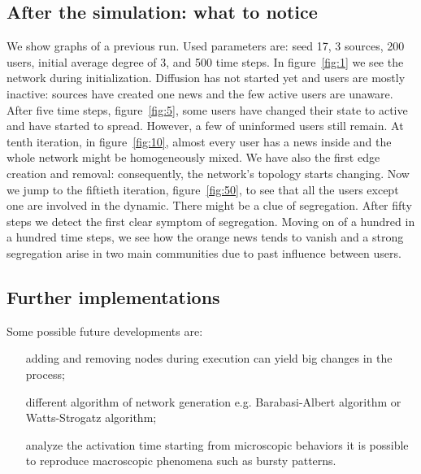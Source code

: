 \subsection{After the simulation: what to notice}\label{subsec:after}
We show graphs of a previous run. Used parameters are: seed 17, 3 sources,
200 users, initial average degree of 3, and 500 time steps.
In figure~\ref{fig:1} we see the network during initialization. Diffusion
has not started yet and users are mostly inactive:
sources have created one news and the few active users are unaware.
After five time steps, figure~\ref{fig:5}, some users have changed their state
to active and have started to spread.
However, a few of uninformed users still remain.
At tenth iteration, in figure~\ref{fig:10}, almost every user
has a news inside and the whole network might be homogeneously mixed. 
We have also the first edge creation and removal: 
consequently, the network's topology starts changing.
Now we jump to the fiftieth iteration, figure~\ref{fig:50}, to see that
all the users except one are involved in the dynamic. There might be a
clue of segregation.
After fifty steps we detect the first clear symptom of segregation.
Moving on of a hundred in a hundred time steps, we see how the orange news
tends to vanish and a strong segregation arise in two main communities
due to past influence between users.

\subsection{Further implementations}\label{subsec:implementations}
Some possible future developments are:
%
\begin{itemize}
\item [adding and removing nodes during execution] can yield big changes
  in the process;
\item [different algorithm of network generation] e.g. Barabasi-Albert
  algorithm or Watts-Strogatz algorithm;
\item [analyze the activation time] starting from microscopic behaviors
  it is possible to reproduce macroscopic phenomena such as bursty
  patterns.\cite{goh_burstiness_2008}
\end{itemize}
%
